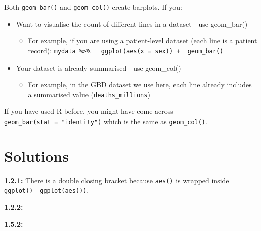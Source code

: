 \documentclass[]{book}
\makeatletter
\newenvironment{Shaded}{\begin{snugshade}}{\end{snugshade}}
\newcommand{\KeywordTok}[1]{\textcolor[rgb]{0.13,0.29,0.53}{\textbf{#1}}}
\newcommand{\DataTypeTok}[1]{\textcolor[rgb]{0.13,0.29,0.53}{#1}}
\newcommand{\StringTok}[1]{\textcolor[rgb]{0.31,0.60,0.02}{#1}}
\newcommand{\OperatorTok}[1]{\textcolor[rgb]{0.81,0.36,0.00}{\textbf{#1}}}
\newcommand{\NormalTok}[1]{#1}
\providecommand{\tightlist}{%
  \setlength{\itemsep}{0pt}\setlength{\parskip}{0pt}}
\newenvironment{kframe}{%
\medskip{}
\setlength{\fboxsep}{.8em}
 \def\at@end@of@kframe{}%
 \ifinner\ifhmode%
  \def\at@end@of@kframe{\end{minipage}}%
  \begin{minipage}{\columnwidth}%
 \fi\fi%
 \def\FrameCommand##1{\hskip\@totalleftmargin \hskip-\fboxsep
 \colorbox{shadecolor}{##1}\hskip-\fboxsep
     \hskip-\linewidth \hskip-\@totalleftmargin \hskip\columnwidth}%
 \MakeFramed {\advance\hsize-\width
   \@totalleftmargin\z@ \linewidth\hsize
   \@setminipage}}%
 {\par\unskip\endMakeFramed%
 \at@end@of@kframe}
\renewenvironment{Shaded}{\begin{kframe}}{\end{kframe}}
\makeatother
\begin{document}
Both \texttt{geom\_bar()} and \texttt{geom\_col()} create barplots. If
you:

\begin{itemize}
\tightlist
\item
  Want to visualise the count of different lines in a dataset - use
  geom\_bar()

  \begin{itemize}
  \tightlist
  \item
    For example, if you are using a patient-level dataset (each line is
    a patient record):
    \texttt{mydata\ \%\textgreater{}\%\ \ \ ggplot(aes(x\ =\ sex))\ +\ \ geom\_bar()}
  \end{itemize}
\item
  Your dataset is already summarised - use geom\_col()

  \begin{itemize}
  \tightlist
  \item
    For example, in the GBD dataset we use here, each line already
    includes a summarised value (\texttt{deaths\_millions})
  \end{itemize}
\end{itemize}

If you have used R before, you might have come across
\texttt{geom\_bar(stat\ =\ "identity")} which is the same as
\texttt{geom\_col()}.

\section{Solutions}\label{solutions}

\textbf{1.2.1:} There is a double closing bracket because \texttt{aes()}
is wrapped inside \texttt{ggplot()} - \texttt{ggplot(aes())}.

\textbf{1.2.2:}

\begin{Shaded}
\end{Shaded}

\textbf{1.5.2:}
\end{document}
